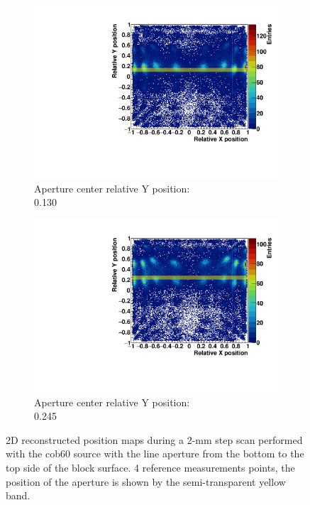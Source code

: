\begin{figure}
\begin{subfigure}[t]{0.5\textwidth}
\centering
\includegraphics[width=\textwidth]{03_GraphicFiles/chapter3_CLaRySproto/Absorber/images_scan/line_2mm_vert/run14_floodMap.pdf}
\caption{Aperture center relative Y position: \\ 0.130}
\label{chap3::fig::scan_map3_vert}
\end{subfigure}
\begin{subfigure}[t]{0.5\textwidth}
\centering
\includegraphics[width=\textwidth]{03_GraphicFiles/chapter3_CLaRySproto/Absorber/images_scan/line_2mm_vert/run15_floodMap.pdf}
\caption{Aperture center relative Y position: \\ 0.245}
\label{chap3::fig::scan_map4_vert}
\end{subfigure}
\caption{2D reconstructed position maps during a 2-mm step scan performed with the \gls{cob60} source with the line aperture from the bottom to the top side of the block surface. 4 reference measurements points, the position of the aperture is shown by the semi-transparent yellow band.}
\label{chap3::fig::ScanFloodMap_Vert}
\end{figure}

